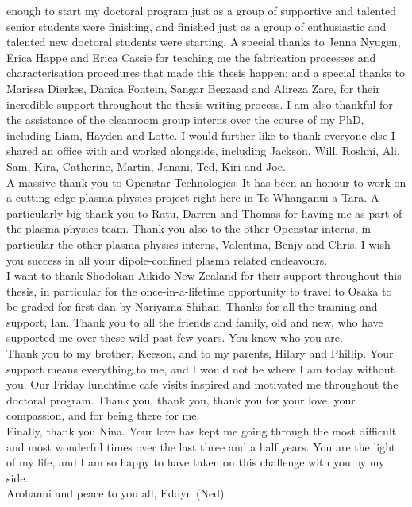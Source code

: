 \documentclass[
  a4paper,
]{scrbook}
\begin{document}
enough to start my doctoral program just as a group of supportive and talented senior students were finishing, and finished just as a group of enthusiastic and talented new doctoral students were starting. A special thanks to Jenna Nyugen, Erica Happe and Erica Cassie for teaching me the fabrication processes and characterisation procedures that made this thesis happen; and a special thanks to Marissa Dierkes, Danica Fontein, Sangar Begzaad and Alireza Zare, for their incredible support throughout the thesis writing process. I am also thankful for the assistance of the cleanroom group interns over the course of my PhD, including Liam, Hayden and Lotte. I would further like to thank everyone else I shared an office with and worked alongside, including Jackson, Will, Roshni, Ali, Sam, Kira, Catherine, Martin, Janani, Ted, Kiri and Joe. \\[5pt] A massive thank you to Openstar Technologies. It has been an honour to work on a cutting-edge plasma physics project right here in Te Whanganui-a-Tara. A particularly big thank you to Ratu, Darren and Thomas for having me as part of the plasma physics team. Thank you also to the other Openstar interns, in particular the other plasma physics interns, Valentina, Benjy and Chris. I wish you success in all your dipole-confined plasma related endeavours. \\[5pt] I want to thank Shodokan Aikido New Zealand for their support throughout this thesis, in particular for the once-in-a-lifetime opportunity to travel to Osaka to be graded for first-dan by Nariyama Shihan. Thanks for all the training and support, Ian. Thank you to all the friends and family, old and new, who have supported me over these wild past few years. You know who you are. \\[5pt] Thank you to my brother, Keeson, and to my parents, Hilary and Phillip. Your support means everything to me, and I would not be where I am today without you. Our Friday lunchtime cafe visits inspired and motivated me throughout the doctoral program. Thank you, thank you, thank you for your love, your compassion, and for being there for me. \\[5pt] Finally, thank you Nina. Your love has kept me going through the most difficult and most wonderful times over the last three and a half years. You are the light of my life, and I am so happy to have taken on this challenge with you by my side. \\[5pt] Arohanui and peace to you all, Eddyn (Ned)

\fancyhf{} %
\thispagestyle{fancy} %
\renewcommand{\headrulewidth}{0pt}
\fancyfoot[R]{\thepage} %
\end{document}
